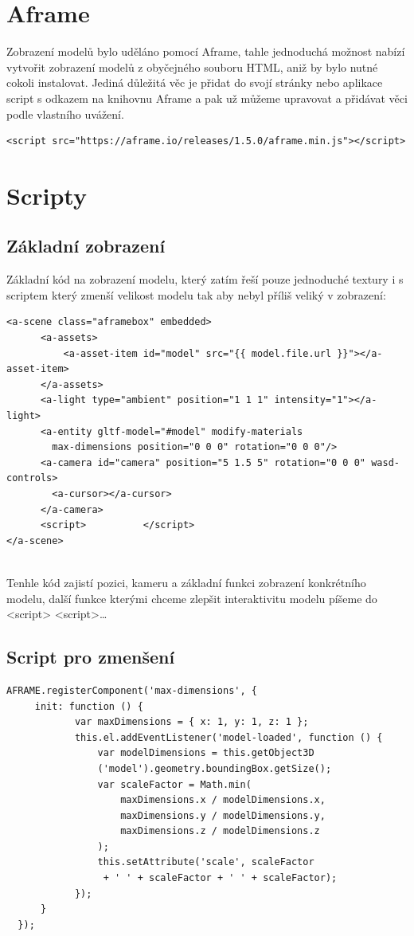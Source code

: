 \documentclass[12pt, a4paper,
twoside,        %
openright
]{report}
\begin{document}
\section[Aframe]{Aframe}
Zobrazení modelů bylo uděláno pomocí Aframe, tahle jednoduchá možnost nabízí vytvořit zobrazení modelů z obyčejného souboru HTML, aniž by bylo nutné cokoli instalovat. Jediná důležitá věc je přidat do svojí stránky nebo aplikace script s odkazem na knihovnu Aframe a pak už můžeme upravovat a přidávat věci podle vlastního uvážení.
\begin{lstlisting}
<script src="https://aframe.io/releases/1.5.0/aframe.min.js"></script>
\end{lstlisting}
\section[Scripty]{Scripty}
\subsection[Základní zobrazení]{Základní zobrazení}
Základní kód na zobrazení modelu, který zatím řeší pouze jednoduché textury i s scriptem který zmenší velikost modelu tak aby nebyl příliš veliký v zobrazení:
\begin{lstlisting}
<a-scene class="aframebox" embedded>
      <a-assets>
          <a-asset-item id="model" src="{{ model.file.url }}"></a-asset-item>
      </a-assets>
      <a-light type="ambient" position="1 1 1" intensity="1"></a-light>
      <a-entity gltf-model="#model" modify-materials 
      	max-dimensions position="0 0 0" rotation="0 0 0"/>
      <a-camera id="camera" position="5 1.5 5" rotation="0 0 0" wasd-controls>
      	<a-cursor></a-cursor>
      </a-camera>
      <script>          </script>
</a-scene>
                  
\end{lstlisting}
Tenhle kód zajistí pozici, kameru a základní funkci zobrazení konkrétního modelu, další funkce kterými chceme zlepšit interaktivitu modelu píšeme do <script>   <script>\dots
\newpage
\subsection[Script pro zmenšení]{Script pro zmenšení}
\begin{lstlisting}
AFRAME.registerComponent('max-dimensions', {
   	 init: function () {
        	var maxDimensions = { x: 1, y: 1, z: 1 };
        	this.el.addEventListener('model-loaded', function () {
        		var modelDimensions = this.getObject3D
        		('model').geometry.boundingBox.getSize();
        		var scaleFactor = Math.min(
        			maxDimensions.x / modelDimensions.x,
        			maxDimensions.y / modelDimensions.y,
       				maxDimensions.z / modelDimensions.z
        		);
        		this.setAttribute('scale', scaleFactor
        		 + ' ' + scaleFactor + ' ' + scaleFactor);
        	});
   	  }
  });
\end{lstlisting}
\end{document}

